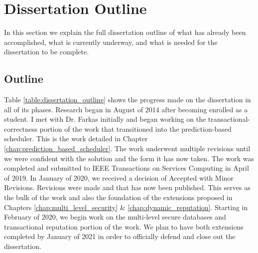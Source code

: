 \section{Dissertation Outline}
\label{diss:dissertation_outline}

\newcommand{\dissPhaseOne}
{\textbf{Transactional Correctness:} Consistency control algorithms prototyped and formally proven as a part of prediction-based solution (PBS). \textbf{Published in IEEE Transactions, February 2020}\newline}

\newcommand{\dissPhaseTwo}
{\textbf{Dissertation Proposal}}

\newcommand{\dissPhaseThree}
{\textbf{Dynamic Transaction Reputation:} Analyze and leverage reputation management solutions within PBS \textbf{Submit a conference paper\newline}}

\newcommand{\dissPhaseFour}
{\textbf{MLS Database Scheduling:} (extension area of PBS) scheduling of transactions based on existing metrics and security classification. \textbf{Submit a conference paper.}}

\newcommand{\dissPhaseFive}
{\textbf{Dissertation Defense}}

In this section we explain the full dissertation outline of what has already been accomplished, what is currently underway, and what is needed for the dissertation to be complete.

\subsection{Outline}

Table \ref{table:dissertation_outline} shows the progress made on the dissertation in all of its phases. Research began in August of 2014 after becoming enrolled as a student. I met with Dr. Farkas initially and began working on the transactional-correctness portion of the work that transitioned into the prediction-based scheduler. This is the work detailed in Chapter \ref{chap:prediction_based_scheduler}. The work underwent multiple revisions until we were confident with the solution and the form it has now taken. The work was completed and submitted to IEEE Transactions on Services Computing in April of 2019. In January of 2020, we received a decision of Accepted with Minor Revisions. Revisions were made and that has now been published. This serves as the bulk of the work and also the foundation of the extensions proposed in Chapters \ref{chap:multi_level_security} \& \ref{chap:dynamic_reputation}. Starting in February of 2020, we begin work on the multi-level secure databases and transactional reputation portion of the work. We plan to have both extensions completed by January of 2021 in order to officially defend and close out the dissertation.

